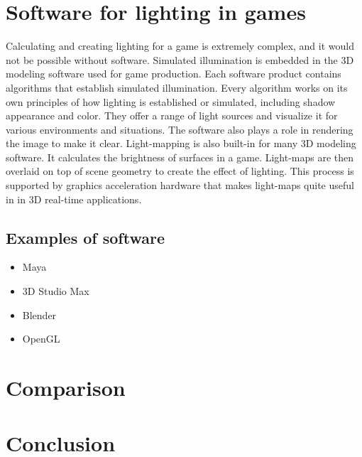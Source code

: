\documentclass[10pt,twoside,english,a4paper]{article}
\begin{document}
\section{Software for lighting in games} \label{fourth}
Calculating and creating lighting for a game is extremely complex, and it would not be possible without software. Simulated illumination is embedded in the 3D modeling software used for game production. Each software product contains algorithms that establish simulated illumination. Every algorithm works on its own principles of how lighting is established or simulated, including shadow appearance and color. \cite{Dynamic-Lighting} They offer a range of light sources and visualize it for various environments and situations. The software also plays a role in rendering the image to make it clear. Light-mapping is also built-in for many 3D modeling software. It calculates the brightness of surfaces in a game. Light-maps are then overlaid on top of scene geometry to create the effect of lighting. This process is supported by graphics acceleration hardware that makes light-maps quite useful in in 3D real-time applications.\cite{Fast-Lighting} \cite{Unity}


\subsection{Examples of software} \label{examples}

\begin{itemize}
\item Maya
\item 3D Studio Max
\item Blender
\item OpenGL

\end{itemize}


\section{Comparison} \label{fifth}


\section{Conclusion} \label{sixth} 




 
\end{document}
